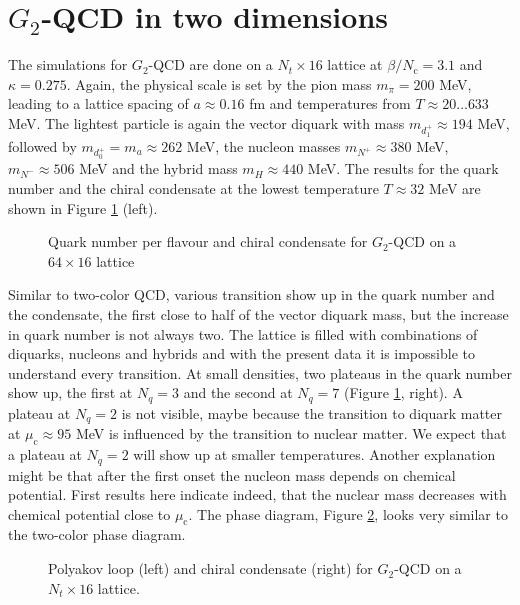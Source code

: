 \documentclass{PoS}
\begin{document}
\section{$G_2$-QCD in two dimensions}
\noindent
The simulations for $G_2$-QCD are done on a $N_t \times 16$ lattice at $\beta/N_\text{c}=3.1$ and $\kappa=0.275$. Again, the physical scale is set by the pion mass $m_\pi=200$ MeV, leading to a lattice spacing of $a\approx 0.16$ fm and temperatures
from $T\approx 20 \dots 633$ MeV. The lightest particle is again the vector diquark with mass $m_{d_1^+}\approx 194$ MeV, followed by $m_{d_0^+}=m_a\approx 262$ MeV, the nucleon masses $m_{N^+}\approx 380$ MeV, $m_{N^-}\approx 506$ MeV 
and the hybrid mass $m_H\approx 440$ MeV. The results for the quark number and the chiral condensate at the lowest temperature $T\approx32$ MeV are shown in Figure \ref{g2qcd} (left).
\begin{figure}[htb]
    \scalebox{1}{}\hskip10mm
     \scalebox{1}{}
  \caption{Quark number per flavour and chiral condensate for $G_2$-QCD on a $64 \times 16$ lattice} 
     \label{g2qcd}
   \end{figure}
Similar to two-color QCD, various transition show up in the quark number
and the condensate, the first close to half of the vector diquark mass, but the increase in quark number is not always two. The lattice is filled with combinations of diquarks, nucleons and hybrids and with the present data it is impossible to understand every transition. 
At small densities, two plateaus in the quark number show up, the first at $N_q=3$ and the second at $N_q=7$ (Figure \ref{g2qcd}, right).
A plateau at $N_q=2$ is not visible, maybe because the transition to diquark matter at $\mu_\text{c}\approx 95$ MeV is influenced by the transition to nuclear matter. We expect that a plateau at $N_q=2$ will show up at smaller temperatures.
Another explanation might be that after the first onset the nucleon mass depends on chemical potential. First results here indicate indeed, that the nuclear mass decreases with chemical potential close to  $\mu_\text{c}$.
The phase diagram, Figure \ref{g2qcdPD}, looks very similar to the two-color phase diagram.
\begin{figure}[htb]
    \scalebox{1}{}\hskip10mm
    \scalebox{1}{}
  \caption{Polyakov loop (left) and chiral condensate (right) for $G_2$-QCD on a $N_t \times 16$ lattice.} 
     \label{g2qcdPD}
   \end{figure}
\end{document}
